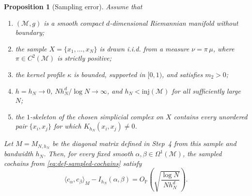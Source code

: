\documentclass[a4paper,11pt, DIV=10]{scrartcl}
\numberwithin{equation}{section}
\newtheorem{proposition}[theorem]{Proposition}
\theoremstyle{definition}
\theoremstyle{remark}
\newcommand{\mc}[1]{\mathcal{#1}}
\begin{document}
\begin{proposition}[Sampling error]
Assume that
\begin{enumerate}
\item $(\mc{M},g)$ is a smooth compact $d$-dimensional Riemannian manifold without boundary;
\item the sample $X=\{x_1,\dots,x_N\}$ is drawn i.i.d. from a measure $\nu=\pi\,\mu$, where $\pi\in C^2(\mc{M})$ is strictly positive;
\item the kernel profile $\kappa$ is bounded, supported in $[0,1)$, and satisfies $m_2>0$;
\item $h=h_N\to 0$, $N h_N^d/\log N\to \infty$, and $h_N<\mathrm{inj}(\mc{M})$ for all sufficiently large $N$;
\item the $1$-skeleton of the chosen simplicial complex on $X$ contains every unordered pair $\{x_i,x_j\}$ for which $K_{h_N}(x_i,x_j)\neq 0$.
\end{enumerate}
Let $M=M_{N,h_N}$ be the diagonal matrix defined in Step~4 from this sample and bandwidth $h_N$.
Then, for every fixed smooth $\alpha,\beta\in \Omega^1(\mc{M})$, the sampled cochains from \eqref{eq:def-sampled-cochains} satisfy
\begin{equation}
\langle c_\alpha,c_\beta\rangle_M-I_{h_N}(\alpha,\beta)
=
O_{\mathbb P}\!\left(\sqrt{\frac{\log N}{N h_N^d}}\right).
\end{equation}
\end{proposition}
\end{document}
